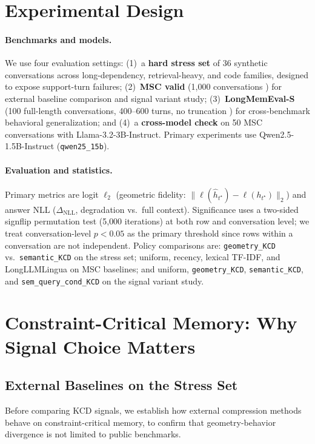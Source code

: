 \documentclass[11pt]{article}
\newcommand{\pname}[1]{\texttt{\small #1}}
\begin{document}
\section{Experimental Design}
\paragraph{Benchmarks and models.}
We use four evaluation settings: (1)~a \textbf{hard stress set} of 36 synthetic conversations across long-dependency, retrieval-heavy, and code families, designed to expose support-turn failures; (2)~\textbf{MSC valid} (1{,}000 conversations \cite{msc}) for external baseline comparison and signal variant study; (3)~\textbf{LongMemEval-S} (100 full-length conversations, 400--600 turns, no truncation \cite{longmemeval}) for cross-benchmark behavioral generalization; and (4)~a \textbf{cross-model check} on 50 MSC conversations with Llama-3.2-3B-Instruct. Primary experiments use Qwen2.5-1.5B-Instruct (\pname{qwen25\_15b}).

\paragraph{Evaluation and statistics.}
\label{sec:metrics}
Primary metrics are logit $\ell_2$ (geometric fidelity: $\lVert\ell(\hat{h}_{t^\star})-\ell(h_{t^\star})\rVert_2$) and answer NLL ($\Delta_\mathrm{NLL}$, degradation vs.\ full context). Significance uses a two-sided signflip permutation test (5{,}000 iterations) at both row and conversation level; we treat conversation-level $p{<}0.05$ as the primary threshold since rows within a conversation are not independent. Policy comparisons are: \pname{geometry\_KCD} vs.\ \pname{semantic\_KCD} on the stress set; uniform, recency, lexical TF-IDF, and LongLLMLingua on MSC baselines; and uniform, \pname{geometry\_KCD}, \pname{semantic\_KCD}, and \pname{sem\_query\_cond\_KCD} on the signal variant study.

\section{Constraint-Critical Memory: Why Signal Choice Matters}
\subsection{External Baselines on the Stress Set}
Before comparing KCD signals, we establish how external compression methods behave on constraint-critical memory, to confirm that geometry-behavior divergence is not limited to public benchmarks.
\end{document}
